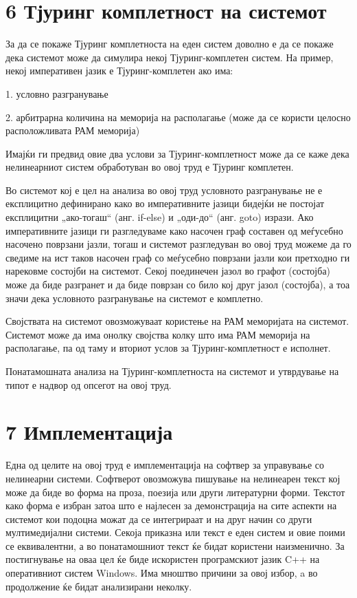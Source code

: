 \section{6 Тјуринг комплетност на системот}

За да се покаже Тјуринг комплетноста на еден систем доволно е да се покаже дека системот може да симулира некој Тјуринг-комплетен систем. На пример, некој императивен јазик е Тјуринг-комплетен ако има:

1. условно разгранување

2. арбитрарна количина на меморија на располагање (може да се користи целосно расположливата РАМ меморија)

Имајќи ги предвид овие два услови за Тјуринг-комплетност може да се каже дека нелинеарниот систем обработуван во овој труд е Тјуринг комплетен.

Во системот кој е цел на анализа во овој труд условното разгранување не е експлицитно дефинирано како во императивните јазици бидејќи не постојат експлицитни „ако-тогаш“ (анг. if-else) и „оди-до“ (анг. goto) изрази. Ако императивните јазици ги разгледуваме како насочен граф составен од меѓусебно насочено поврзани јазли, тогаш и системот разгледуван во овој труд можеме да го сведиме на ист таков насочен граф со меѓусебно поврзани јазли кои претходно ги нарековме состојби на системот. Секој поединечен јазол во графот (состојба) може да биде разгранет и да биде поврзан со било кој друг јазол (состојба), а тоа значи дека условното разгранување на системот е комплетно.

Својствата на системот овозможуваат користење на РАМ меморијата на системот. Системот може да има онолку својства колку што има РАМ меморија на располагање, па од таму и вториот услов за Тјуринг-комплетност е исполнет.

Понатамошната анализа на Тјуринг-комплетноста на системот и утврдување на типот е надвор од опсегот на овој труд.

\section{7 Имплементација}

Една од целите на овој труд е имплементација на софтвер за управување со нелинеарни системи. Софтверот овозможува пишување на нелинеарен текст кој може да биде во форма на проза, поезија или други литературни форми. Текстот како форма е избран затоа што е најлесен за демонстрација на сите аспекти на системот кои подоцна можат да се интегрираат и на друг начин со други мултимедијални системи. Секоја приказна или текст е еден систем и овие поими се еквивалентни, а во понатамошниот текст ќе бидат користени наизменично. За постигнување на оваа цел ќе биде искористен програмскиот јазик C++ на оперативниот систем Windows. Има мноштво причини за овој избор, a во продолжение ќе бидат анализирани неколку.

